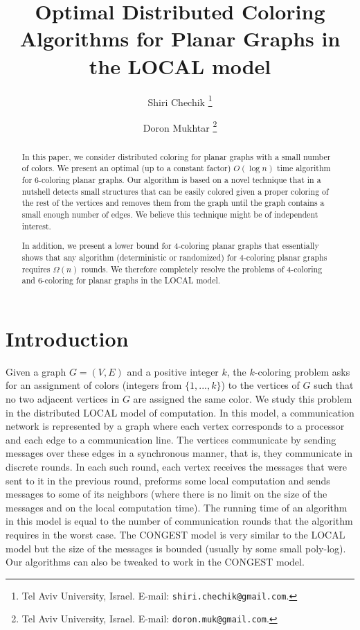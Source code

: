 \documentclass{article}
\title{Optimal Distributed Coloring Algorithms for Planar Graphs in the LOCAL model}
\author{
Shiri Chechik
\thanks{Tel Aviv University, Israel.
E-mail: {\tt shiri.chechik@gmail.com}.
}
\and
Doron Mukhtar
\thanks{Tel Aviv University, Israel.
E-mail: {\tt doron.muk@gmail.com}.
}
}
\theoremstyle{definition}
\begin{document}
\begin{titlepage}
\maketitle
\thispagestyle{empty}

\begin{abstract}
In this paper, we consider distributed coloring for planar graphs with a small number of colors.
We present an optimal (up to a constant factor) $O(\log{n})$ time algorithm for 6-coloring planar graphs.
Our algorithm is based on a novel technique that in a nutshell detects small structures that
can be easily colored given a proper coloring of the rest of the vertices and
removes them from the graph until the graph contains a small enough number of edges.
We believe this technique might be of independent interest.

In addition, we present a lower bound for 4-coloring planar graphs that essentially shows that any algorithm (deterministic or randomized) for $4$-coloring planar graphs requires $\Omega(n)$ rounds.
We therefore completely resolve the problems of 4-coloring and 6-coloring for planar graphs in the LOCAL model.

\end{abstract}
\end{titlepage}

\section{Introduction}

Given a graph $G = (V,E)$ and a positive integer $k$, the $k$-coloring problem asks for an assignment of colors (integers from $\{1,...,k\}$) to the vertices of $G$ such that no two adjacent vertices in $G$ are assigned the same color. We study this problem in the distributed LOCAL model of computation. In this model, a communication network is represented by a graph where each vertex corresponds to a processor and each edge to a communication line. The vertices communicate by sending messages over these edges in a synchronous manner, that is, they communicate in discrete rounds. In each such round, each vertex receives the messages that were sent to it in the previous round, preforms some local computation and sends messages to some of its neighbors (where there is no limit on the size of the messages and on the local computation time).
The running time of an algorithm in this model is equal to the number of communication rounds that the algorithm requires in the worst case.
The CONGEST model is very similar to the LOCAL model but the size of the messages is bounded (usually by some small poly-log).
Our algorithms can also be tweaked to work in the CONGEST model.
\end{document}
